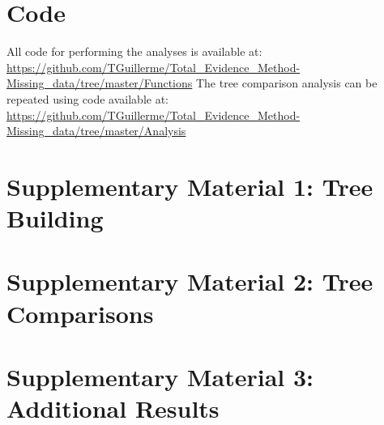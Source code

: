 \section{Code}
All code for performing the analyses is available at: \url{https://github.com/TGuillerme/Total\_Evidence\_Method-Missing\_data/tree/master/Functions} The tree comparison analysis can be repeated using code available at: \url{https://github.com/TGuillerme/Total\_Evidence\_Method-Missing\_data/tree/master/Analysis} %

\newpage
\section{Supplementary Material 1: Tree Building}
  
  \label{Supp_TreeBuilding}

\newpage
\section{Supplementary Material 2: Tree Comparisons}
  
  \label{Supp_TreeComparison}

\newpage
\section{Supplementary Material 3: Additional Results}
  
  \label{Supp_results}